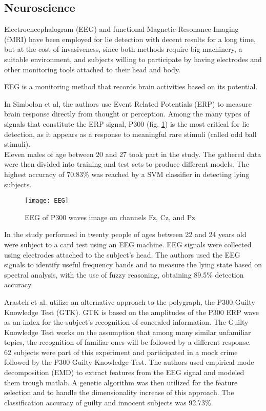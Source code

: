 \subsection{Neuroscience} \label{neuro}
Electroencephalogram (EEG) and functional Magnetic Resonance Imaging (fMRI) have been employed for lie detection with decent results for a long time, but at the cost of invasiveness, since both methods require big machinery, a suitable environment, and subjects willing to participate by having electrodes and other monitoring tools attached to their head and body.

EEG is a monitoring method that records brain activities based on its potential.

In \cite{7440177} Simbolon et al, the authors use Event Related Potentials (ERP) to measure brain response directly from thought or perception. Among the many types of signals that constitute the ERP signal, P300 (fig. \ref{fig:EEG}) is the most critical for lie detection, as it appears as a response to meaningful rare stimuli (called odd ball stimuli). \\
Eleven males of age between 20 and 27 took part in the study. The gathered data were then divided into training and test sets to produce different models. The highest accuracy of 70.83\% was reached by a SVM classifier in detecting lying subjects.

\begin{figure}[H]
	\centering
	\texttt{[image: EEG]}
	\caption{EEG of P300 waves image on channels Fz, Cz, and Pz}
	\label{fig:EEG}
\end{figure}

In the study performed in \cite{Lai2017} twenty people of ages between 22 and 24 years old were subject to a card test using an EEG machine. EEG signals were collected using electrodes attached to the subject’s head. The authors used the EEG signals to identify useful frequency bands and to measure the lying state based on spectral analysis, with the use of fuzzy reasoning, obtaining 89.5\% detection accuracy.

Arasteh et al. \cite{7511728} utilize an alternative approach to the polygraph, the P300 Guilty Knowledge Test (GTK). GTK is based on the amplitudes of the P300 ERP wave as an index for the subject's recognition of concealed information. The Guilty Knowledge Test works on the assumption that among many similar unfamiliar topics, the recognition of familiar ones will be followed by a different response. \\
62 subjects were part of this experiment and participated in a mock crime followed by the P300 Guilty Knowledge Test. The authors used empirical mode decomposition (EMD) to extract features from the EEG signal and modeled them trough matlab. A genetic algorithm was then utilized for the feature selection and to handle the dimensionality increase of this approach. The classification accuracy of guilty and innocent subjects was 92.73\%.

